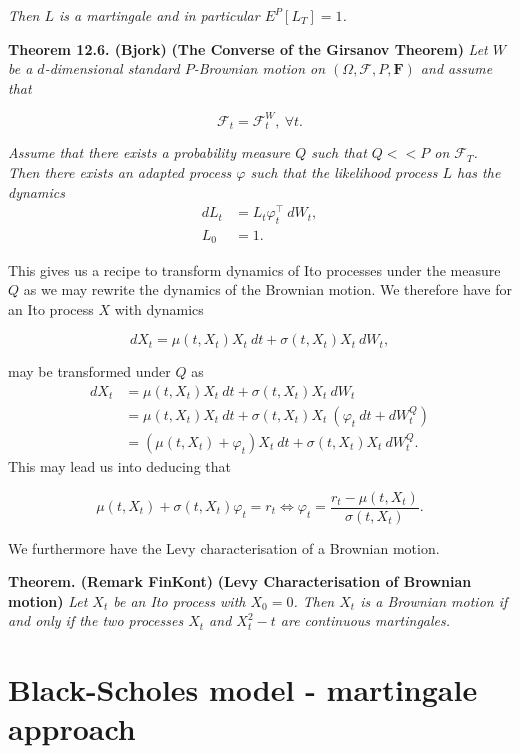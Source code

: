 \documentclass[a4paper,10pt,openany]{book}
\begin{document}
\emph{Then \(L\) is a martingale and in particular \(E^P[L_T]=1\).}

\textbf{Theorem 12.6. (Bjork)} \textbf{(The Converse of the Girsanov Theorem)} \emph{Let \(W\) be a \(d\)-dimensional standard \(P\)-Brownian motion on \((\Omega,\mathcal{F},P,\mathbf{F})\) and assume that}

\[
\mathcal{F}_t=\mathcal{F}^W_t,\ \forall t.
\]

\emph{Assume that there exists a probability measure \(Q\) such that \(Q<<P\) on \(\mathcal{F}_T\). Then there exists an adapted process \(\varphi\) such that the likelihood process \(L\) has the dynamics}
\begin{align*}
dL_t&=L_t\varphi^\top_t\ dW_t,\\
L_0&=1.
\end{align*}

This gives us a recipe to transform dynamics of Ito processes under the measure \(Q\) as we may rewrite the dynamics of the Brownian motion. We therefore have for an Ito process \(X\) with dynamics

\[
dX_t=\mu(t,X_t)X_t\ dt+\sigma(t,X_t) X_t\ dW_t,
\]

may be transformed under \(Q\) as
\begin{align*}
dX_t&=\mu(t,X_t)X_t\ dt+\sigma(t,X_t) X_t\ dW_t\\
&=\mu(t,X_t)X_t\ dt+\sigma(t,X_t) X_t\ (\varphi_t\ dt+dW_t^Q)\\
&=\left(\mu(t,X_t) + \varphi_t\right) X_t\ dt + \sigma(t,X_t)X_t\ dW_t^Q.
\end{align*}
This may lead us into deducing that

\[
\mu(t,X_t)+\sigma(t,X_t)\varphi_t=r_t\iff\varphi_t=\frac{r_t-\mu(t,X_t)}{\sigma(t,X_t)}.
\]

We furthermore have the Levy characterisation of a Brownian motion.

\textbf{Theorem. (Remark FinKont)} \textbf{(Levy Characterisation of Brownian motion)} \emph{Let \(X_t\) be an Ito process with \(X_0=0\). Then \(X_t\) is a Brownian motion if and only if the two processes \(X_t\) and \(X_t^2-t\) are continuous martingales.}

\hypertarget{black-scholes-model---martingale-approach}{%
\section{Black-Scholes model - martingale approach}\label{black-scholes-model---martingale-approach}}
\end{document}
